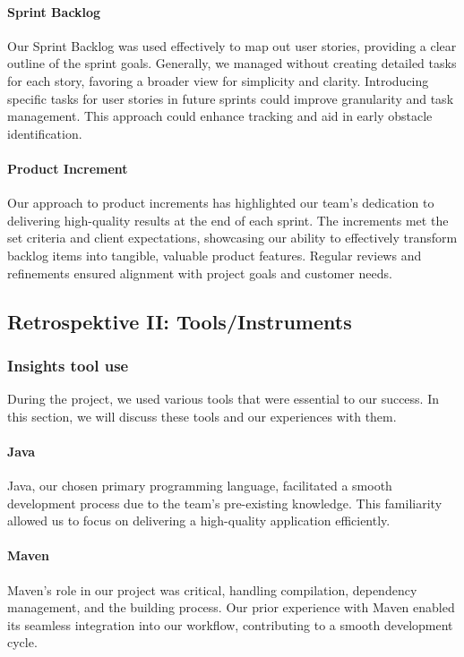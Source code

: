 \paragraph{Sprint Backlog}
Our Sprint Backlog was used effectively to map out user stories, providing a clear outline of the sprint goals.
Generally, we managed without creating detailed tasks for each story, favoring a broader view for simplicity and clarity.
Introducing specific tasks for user stories in future sprints could improve granularity and task management.
This approach could enhance tracking and aid in early obstacle identification.

\paragraph{Product Increment}
Our approach to product increments has highlighted our team's dedication to delivering high-quality results at the end of each sprint.
The increments met the set criteria and client expectations, showcasing our ability to effectively transform backlog items into tangible, valuable product features.
Regular reviews and refinements ensured alignment with project goals and customer needs.


\subsection{Retrospektive II: Tools/Instruments}

\subsubsection{Insights tool use}
During the project, we used various tools that were essential to our success.
In this section, we will discuss these tools and our experiences with them.

\paragraph{Java}
Java, our chosen primary programming language, facilitated a smooth development process due to the team's pre-existing knowledge.
This familiarity allowed us to focus on delivering a high-quality application efficiently.

\paragraph{Maven}
Maven's role in our project was critical, handling compilation, dependency management, and the building process.
Our prior experience with Maven enabled its seamless integration into our workflow, contributing to a smooth development cycle.

